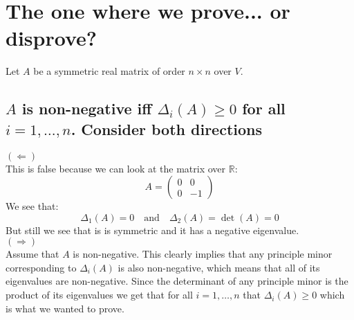 \documentclass[11pt,a4paper]{article}
\theoremstyle{plain}
\newcommand{\R}{\mathbb{R}}
\begin{document}
	\newpage
	
	\section{The one where we prove... or disprove?}
	Let $A$ be a symmetric real matrix of order $n\times n$ over $V$.
	\subsection{$A$ is non-negative iff $\Delta_i(A) \geq 0$ for all 
	$i = 1,\dots,n$. Consider both directions}
	\underline{$(\Leftarrow)$} \\
	This is false because we can look at the matrix over $\R$:
	\[
	A = 
		\begin{pmatrix}
			0 & 0 \\
			0 & -1
		\end{pmatrix}
	\]
	We see that:
	\[
		\Delta_1(A) = 0 \quad\text{and}\quad \Delta_2(A) = \det(A) = 0
	\]
	But still we see that is is symmetric and it has a negative eigenvalue.
	\\
	\underline{$(\Rightarrow)$} \\
	Assume that $A$ is non-negative. This clearly implies that any principle 
	minor corresponding to $\Delta_i(A)$ is also non-negative, which means that
	all of its eigenvalues are non-negative. Since the determinant of any
	principle minor is the product of its eigenvalues we get that for all
	$i = 1,\dots,n$ that $\Delta_i(A) \geq 0$ which is what we wanted to prove.
	
	\newpage
	
	\iffalse
	\section{The one with the extra difficulty}
	\subsection{Let $f$, $g$ be inner products on $V$ a finite-dimension vector 
	space. Prove that exists a basis that is orthonormal by $f$ and orthogonal 
	by $g$.}
	\fi
	
	
	
	
	
	
\end{document}
